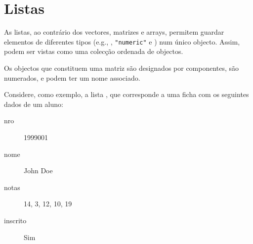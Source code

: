 \documentclass{exam}
\begin{document}
\section{Listas}

As listas, ao contrário dos vectores, matrizes e arrays, permitem guardar elementos de diferentes tipos (e.g., , \texttt{"numeric"} e ) num único objecto. Assim, podem ser vistas como uma colecção ordenada de objectos.

Os objectos que constituem uma matriz são designados por componentes, são numerados, e podem ter um nome associado.

Considere, como exemplo, a lista , que corresponde a uma ficha com os seguintes dados de um aluno:

\begin{center}
\begin{description}
\item[nro] 1999001
\item[nome] John Doe
\item[notas] 14, 3, 12, 10, 19
\item[inscrito] Sim
\end{description}
\end{center}
\end{document}
